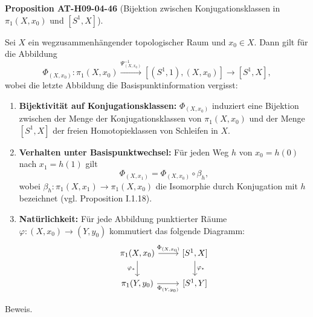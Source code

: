 \documentclass[10pt, letterpaper]{article}
\newcommand{\CustomHeading}[3]{%
  \par\medskip\noindent%
  \textbf{#1 #2} \textnormal{(#3)}.\enskip%
}
\newenvironment{PROP}[2]{\begin{unitbox}\CustomHeading{Proposition}{#1}{#2}}{\end{unitbox}}
\begin{document}
\begin{PROP}{AT-H09-04-46}{Bijektion zwischen Konjugationsklassen in $\pi_1\left(X, x_0\right)$ und $\left[S^1, X\right]$}
Sei \(X\) ein wegzusammenhängender topologischer Raum und \(x_0 \in X\). Dann gilt für die Abbildung
\[
\Phi_{\left(X, x_0\right)}: \pi_1\left(X, x_0\right) \xrightarrow{\Psi_{\left(X, x_0\right)}^{-1}}\left[\left(S^1, 1\right),\left(X, x_0\right)\right] \rightarrow\left[S^1, X\right],
\]
wobei die letzte Abbildung die Basispunktinformation vergisst:

\begin{enumerate}
  \item \textbf{Bijektivität auf Konjugationsklassen:} \(\Phi_{(X,x_0)}\) induziert eine Bijektion zwischen der Menge der Konjugationsklassen von \(\pi_1(X, x_0)\) und der Menge \([S^1, X]\) der freien Homotopieklassen von Schleifen in \(X\).
  
  \item \textbf{Verhalten unter Basispunktwechsel:} Für jeden Weg \(h\) von \(x_0 = h(0)\) nach \(x_1 = h(1)\) gilt
  \[
  \Phi_{(X,x_1)} = \Phi_{(X,x_0)} \circ \beta_h,
  \]
  wobei \(\beta_h: \pi_1(X, x_1) \to \pi_1(X, x_0)\) die Isomorphie durch Konjugation mit \(h\) bezeichnet (vgl. Proposition I.1.18).
  
  \item \textbf{Natürlichkeit:} Für jede Abbildung punktierter Räume \(\varphi: (X,x_0) \to (Y,y_0)\) kommutiert das folgende Diagramm:
  \[
  \begin{tikzcd}
  \pi_1(X, x_0) \arrow[r, "\Phi_{(X,x_0)}"] \arrow[d, "\varphi_*"'] & {[S^1, X]} \arrow[d, "\varphi_*"] \\
  \pi_1(Y, y_0) \arrow[r, "\Phi_{(Y,y_0)}"'] & {[S^1, Y]}
  \end{tikzcd}
  \]
\end{enumerate}
\end{PROP}


Beweis. 
\end{document}
